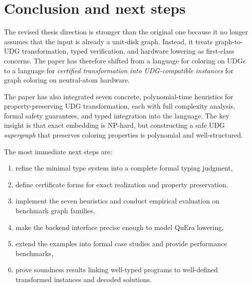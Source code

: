 \documentclass[11pt]{article}
\begin{document}
\newpage

\section{Conclusion and next steps}

The revised thesis direction is stronger than the original one because it no longer assumes that the input is already a unit-disk graph. Instead, it treats graph-to-UDG transformation, typed verification, and hardware lowering as first-class concerns. The paper has therefore shifted from a language for coloring on UDGs to a language for \emph{certified transformation into UDG-compatible instances} for graph coloring on neutral-atom hardware.

The paper has also integrated seven concrete, polynomial-time heuristics for property-preserving UDG transformation, each with full complexity analysis, formal safety guarantees, and typed integration into the language. The key insight is that exact embedding is NP-hard, but constructing a safe UDG \emph{supergraph} that preserves coloring properties is polynomial and well-structured.

The most immediate next steps are:
\begin{enumerate}[label=(\arabic*)]
    \item refine the minimal type system into a complete formal typing judgment,
    \item define certificate forms for exact realization and property preservation,
    \item implement the seven heuristics and conduct empirical evaluation on benchmark graph families,
    \item make the backend interface precise enough to model QuEra lowering,
    \item extend the examples into formal case studies and provide performance benchmarks,
    \item prove soundness results linking well-typed programs to well-defined transformed instances and decoded solutions.
\end{enumerate}
\end{document}

